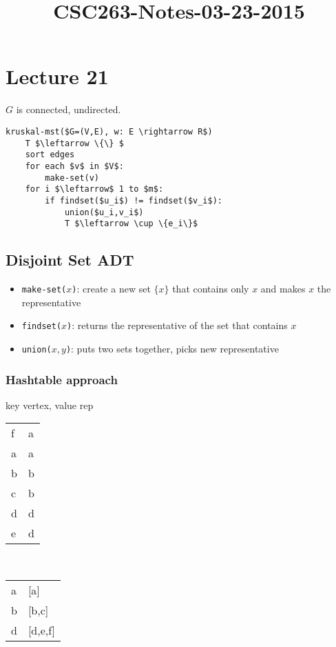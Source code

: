 



\title{CSC263-Notes-03-23-2015}



\section*{Lecture 21}

\noindent $G$ is connected, undirected.

\begin{lstlisting}[mathescape]
kruskal-mst($G=(V,E), w: E \rightarrow R$)
	T $\leftarrow \{\} $
	sort edges
	for each $v$ in $V$:
		make-set(v)
	for i $\leftarrow$ 1 to $m$:
		if findset($u_i$) != findset($v_i$):
			union($u_i,v_i$)
			T $\leftarrow \cup \{e_i\}$ 
\end{lstlisting}

\subsection*{Disjoint Set ADT}

\begin{itemize}
	\item[] \texttt{make-set($x$)}: create a new set $\{x\}$ that contains only
	$x$ and makes $x$ the representative
	\item[] \texttt{findset($x$)}: returns the representative of the set that
	contains $x$
	\item[] \texttt{union($x,y$)}: puts two sets together, picks new
	representative 
\end{itemize}

\subsubsection*{Hashtable approach}

\noindent key vertex, value rep

\begin{tabular}{l @{ : } l}
	f & a \\
	a & a \\
	b & b \\
	c & b \\
	d & d \\
	e & d \\
\end{tabular} \\

\begin{tabular}{l @{$\rightarrow$} l}
	a & [a] \\
	b & [b,c] \\
	d & [d,e,f] \\
\end{tabular}

